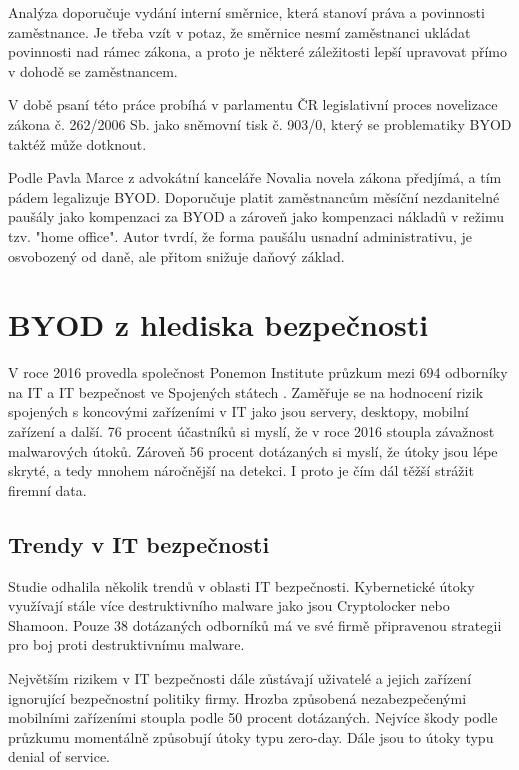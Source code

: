Analýza \cite{pravniProstor} doporučuje vydání interní směrnice, která stanoví práva a povinnosti zaměstnance. Je třeba vzít v potaz, že směrnice nesmí zaměstnanci ukládat povinnosti nad rámec zákona, a proto je některé záležitosti lepší upravovat přímo v dohodě se zaměstnancem.

V době psaní této práce probíhá v parlamentu ČR legislativní proces novelizace zákona č. 262/2006 Sb. jako sněmovní tisk č. 903/0, který se problematiky BYOD taktéž může dotknout.

Podle Pavla Marce z advokátní kanceláře Novalia \cite{HomeOffice} novela zákona předjímá, a tím pádem legalizuje BYOD. Doporučuje platit zaměstnancům měsíční nezdanitelné paušály jako kompenzaci za BYOD a zároveň jako kompenzaci nákladů v režimu tzv. "home office". Autor tvrdí, že forma paušálu usnadní administrativu, je osvobozený od daně, ale přitom snižuje daňový základ. 

\section{BYOD z hlediska bezpečnosti}

V roce 2016 provedla společnost Ponemon Institute průzkum mezi 694 odborníky na IT a IT bezpečnost ve Spojených státech \cite{ponemon}. Zaměřuje se na hodnocení rizik spojených s koncovými zařízeními v IT jako jsou servery, desktopy, mobilní zařízení a další. 76 procent účastníků si myslí, že v roce 2016 stoupla závažnost malwarových útoků. Zároveň 56 procent dotázaných si myslí, že útoky jsou lépe skryté, a tedy mnohem náročnější na detekci. I proto je čím dál těžší strážit firemní data.


\subsection{Trendy v IT bezpečnosti}

Studie \cite{ponemon} odhalila několik trendů v oblasti IT bezpečnosti. Kybernetické útoky využívají stále více destruktivního malware jako jsou Cryptolocker nebo Shamoon. Pouze 38 dotázaných odborníků má ve své firmě připravenou strategii pro boj proti destruktivnímu malware.

Největším rizikem v IT bezpečnosti dále zůstávají uživatelé a jejich zařízení ignorující bezpečnostní politiky firmy. Hrozba způsobená nezabezpečenými mobilními zařízeními stoupla podle 50 procent dotázaných. Nejvíce škody podle průzkumu momentálně způsobují útoky typu zero-day. Dále jsou to útoky typu denial of service.

